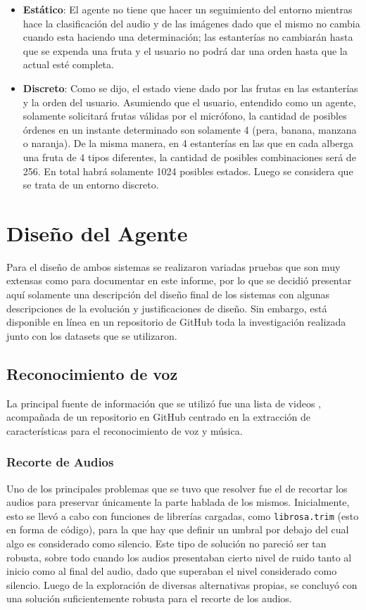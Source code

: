 \documentclass[a4paper, 12pt]{article}
\begin{document}
\begin{itemize}
\item \textbf{Estático}: El agente no tiene que hacer un seguimiento del entorno mientras hace la clasificación del audio y de las imágenes dado que el mismo no cambia cuando esta haciendo una determinación; las estanterías no cambiarán hasta que se expenda una fruta y el usuario no podrá dar una orden hasta que la actual esté completa.
\item \textbf{Discreto}: Como se dijo, el estado viene dado por las frutas en las estanterías y la orden del usuario. Asumiendo que el usuario, entendido como un agente, solamente solicitará frutas válidas por el micrófono, la cantidad de posibles órdenes en un instante determinado son solamente 4 (pera, banana, manzana o naranja). De la misma manera, en 4 estanterías en las que en cada alberga una fruta de 4 tipos diferentes, la cantidad de posibles combinaciones será de 256. En total habrá solamente 1024 posibles estados. Luego se considera que se trata de un entorno discreto.
\end{itemize}
\section{Diseño del Agente}
Para el diseño de ambos sistemas se realizaron variadas pruebas que son muy extensas como para documentar en este informe, por lo que se decidió presentar aquí solamente una descripción del diseño final de los sistemas con algunas descripciones de la evolución y justificaciones de diseño. Sin embargo, está disponible en línea en un repositorio de GitHub \cite{cita_repositorio_github} toda la investigación realizada junto con los datasets que se utilizaron.
\subsection{Reconocimiento de voz}
La principal fuente de información que se utilizó fue una lista de videos \cite{cita_videos}, acompañada de un repositorio en GitHub \cite{cita_repositorio} centrado en la extracción de características para el reconocimiento de voz y música.
\subsubsection{Recorte de Audios}
Uno de los principales problemas que se tuvo que resolver fue el de recortar los audios para preservar únicamente la parte hablada de los mismos. Inicialmente, esto se llevó a cabo con funciones de librerías cargadas, como \texttt{librosa.trim} (esto en forma de código), para la que hay que definir un umbral por debajo del cual algo es considerado como silencio. Este tipo de solución no pareció ser tan robusta, sobre todo cuando los audios presentaban cierto nivel de ruido tanto al inicio como al final del audio, dado que superaban el nivel considerado como silencio. Luego de la exploración de diversas alternativas propias, se concluyó con una solución suficientemente robusta para el recorte de los audios.
\end{document}
